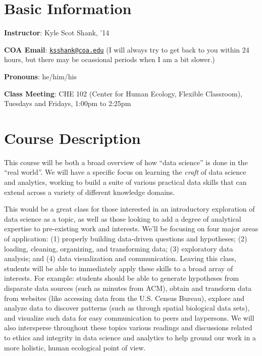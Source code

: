 \documentclass[
]{book}
\begin{document}
\hypertarget{basic-information}{%
\section*{Basic Information}\label{basic-information}}

\textbf{Instructor}: Kyle Scot Shank, '14

\textbf{COA Email}: \href{mailto:ksshank@coa.edu}{\nolinkurl{ksshank@coa.edu}} (I will always try to get back to you within 24 hours, but there may be ocassional periods when I am a bit slower.)

\textbf{Pronouns}: he/him/his

\textbf{Class Meeting}: CHE 102 (Center for Human Ecology, Flexible Classroom), Tuesdays and Fridays, 1:00pm to 2:25pm

\hypertarget{course-description}{%
\section*{Course Description}\label{course-description}}

This course will be both a broad overview of how ``data science'' is done in the ``real world''. We will have a specific focus on learning the \emph{craft} of data science and analytics, working to build a suite of various practical data skills that can extend across a variety of different knowledge domains.

This would be a great class for those interested in an introductory exploration of data science as a topic, as well as those looking to add a degree of analytical expertise to pre-existing work and interests. We'll be focusing on four major areas of application: (1) properly building data-driven questions and hypotheses; (2) loading, cleaning, organizing, and transforming data; (3) exploratory data analysis; and (4) data visualization and communication. Leaving this class, students will be able to immediately apply these skills to a broad array of interests. For example: students should be able to generate hypotheses from disparate data sources (such as minutes from ACM), obtain and transform data from websites (like accessing data from the U.S. Census Bureau), explore and analyze data to discover patterns (such as through spatial biological data sets), and visualize such data for easy communication to peers and laypersons. We will also intersperse throughout these topics various readings and discussions related to ethics and integrity in data science and analytics to help ground our work in a more holistic, human ecological point of view.
\end{document}
